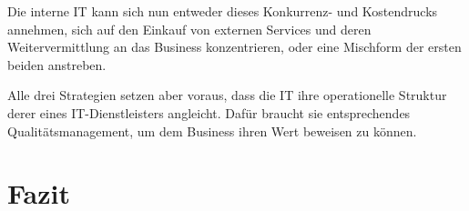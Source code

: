 \documentclass[11pt,listof=totoc]{scrreprt} %
\theoremstyle{definition}
\begin{document}
Die interne IT kann sich nun entweder dieses Konkurrenz- und Kostendrucks annehmen, sich auf den Einkauf von externen Services und deren Weitervermittlung an das Business konzentrieren, oder eine Mischform der ersten beiden anstreben.

Alle drei Strategien setzen aber voraus, dass die IT ihre operationelle Struktur derer eines IT-Dienstleisters angleicht. Dafür braucht sie entsprechendes Qualitätsmanagement, um dem Business ihren Wert beweisen zu können.

\chapter{Fazit}

\listoffigures



\end{document}

